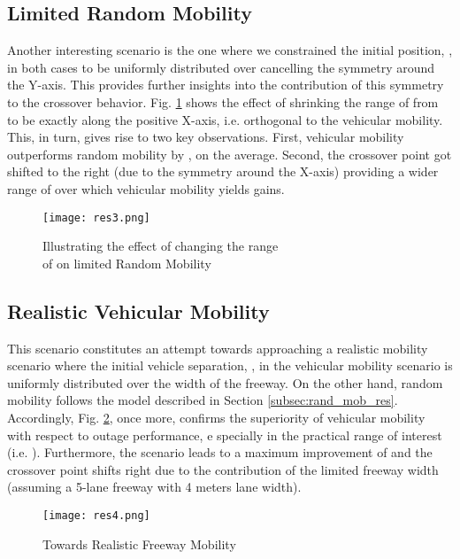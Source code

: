 \documentclass[conference,a4paper]{IEEEtran}
\begin{document}
\subsection{Limited Random Mobility}
Another interesting scenario is the one where we constrained the initial position, , in both cases to be uniformly distributed over  cancelling the symmetry around the Y-axis. This provides further insights into the contribution of this symmetry to the crossover behavior. Fig. \ref{Fig:lim_rand_around_x} shows the effect of shrinking the range of  from  to be exactly along the positive X-axis, i.e. orthogonal to the vehicular mobility. This, in turn, gives rise to two key observations. First, vehicular mobility outperforms random mobility by , on the average. Second, the crossover point got shifted to the right (due to the symmetry around the X-axis) providing a wider range of  over which vehicular mobility yields gains.
\begin{figure}[!t]
\centering
\texttt{[image: res3.png]}
\setlength{\abovecaptionskip}{-10pt}
\setlength{\belowcaptionskip}{-10pt}
\caption{Illustrating the effect of changing the range \\ of  on limited Random Mobility}
\label{Fig:lim_rand_around_x}
\end{figure}


\subsection{Realistic Vehicular Mobility}
This scenario constitutes an attempt towards approaching a realistic mobility scenario where the initial vehicle separation, , in the vehicular mobility scenario is uniformly distributed over the width of the freeway. On the other hand, random mobility follows the model described in Section \ref{subsec:rand_mob_res}. Accordingly, Fig. \ref{Fig:realistic}, once more, confirms the superiority of  vehicular mobility with respect to outage performance, e	specially in the practical range of interest (i.e. ). Furthermore, the scenario leads to a maximum improvement of  and the crossover point shifts right due to the contribution of the limited freeway width (assuming a 5-lane freeway with 4 meters lane width).
\begin{figure}[!t]
\centering
\texttt{[image: res4.png]}
\setlength{\abovecaptionskip}{-10pt}
\setlength{\belowcaptionskip}{-10pt}
\caption{Towards Realistic Freeway Mobility}
\label{Fig:realistic}
\end{figure}
\end{document}

